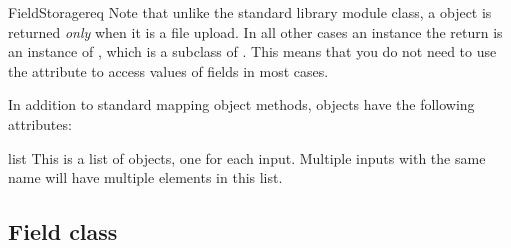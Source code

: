 \begin{classdesc}{FieldStorage}{req}
Note that unlike the standard library  module
 class, a  object is returned
\emph{only} when it is a file upload. In all other cases an instance
the return is an instance of , which is a subclass
of . This means that you do not need to use the
 attribute to access values of fields in most cases.

In addition to standard mapping object methods,  objects
have the following attributes:

\begin{memberdesc}{list}
This is a list of  objects, one for each input. Multiple
inputs with the same name will have multiple elements in this list.
\end{memberdesc}

\end{classdesc}

\subsection{Field class\label{pyapi-util-fstor-fld}}


